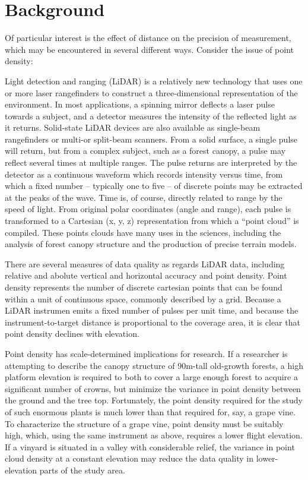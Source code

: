 \documentclass[10pt,a4paper]{report}
\begin{document}
\section{Background}

Of particular interest is the effect of distance on the precision of measurement, which may be encountered in several different ways. Consider the issue of point density:

Light detection and ranging (LiDAR) is a relatively new technology that uses one or more laser rangefinders to construct a three-dimensional representation of the environment. In most applications, a spinning mirror deflects a laser pulse towards a subject, and a detector measures the intensity of the reflected light as it returns. Solid-state LiDAR devices are also available as single-beam rangefinders or multi-or split-beam scanners. From a solid surface, a single pulse will return, but from a complex subject, such as a forest canopy, a pulse may reflect several times at multiple ranges. The pulse returns are interpreted by the detector as a continuous waveform which records intensity versus time, from which a fixed number -- typically one to five -- of discrete points may be extracted at the peaks of the wave. Time is, of course, directly related to range by the speed of light. From original polar coordinates (angle and range), each pulse is transformed to a Cartesian (x, y, z) representation from which a “point cloud” is compiled. These points clouds have many uses in the sciences, including the analysis of forest canopy structure and the production of precise terrain models. 

There are several measures of data quality as regards LiDAR data, including relative and abolute vertical and horizontal accuracy and point density. Point density represents the number of discrete cartesian points that can be found within a unit of continuous space, commonly described by a grid. Because a LiDAR instrumen emits a fixed number of pulses per unit time, and because the instrument-to-target distance is proportional to the coverage area, it is clear that point density declines with elevation. 

Point density has scale-determined implications for research. If a researcher is attempting to describe the canopy structure of 90m-tall old-growth forests, a high platform elevation is required to both to cover a large enough forest to acquire a significant number of crowns, but minimize the variance in point density between the ground and the tree top. Fortunately, the point density required for the study of such enormous plants is much lower than that required for, say, a grape vine. To characterize the structure of a grape vine, point density must be suitably high, which, using the same instrument as above, requires a lower flight elevation. If a vinyard is situated in a valley with considerable relief, the variance in point cloud density at a constant elevation may reduce the data quality in lower-elevation  parts of the study area.
\end{document}
